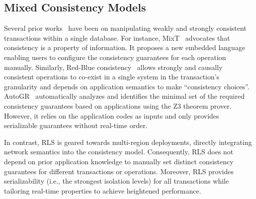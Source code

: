 \subsection{Mixed Consistency Models}\label{sec:related:mixed}
Several prior works~\cite{milano2018mixt, li2012making, wang2021autogr, yang2017hierarchical, li2018fine, gao2003application, kraska2009consistency, mdcc:eurosys13} have been on manipulating weakly and strongly consistent transactions within a single database. For instance, MixT~\cite{milano2018mixt} advocates that consistency is a property of information. It proposes a new embedded language enabling users to configure the consistency guarantees for each operation manually. Similarly, Red-Blue consistency~\cite{li2012making} allows strongly and causally consistent operations to co-exist in a single system in the transaction's granularity and depends on application semantics to make ``consistency choices''. AutoGR~\cite{wang2021autogr} automatically analyzes and identifies the minimal set of the required consistency guarantees based on applications using the Z3 theorem prover. However, it relies on the application codes as inputs and only provides serializable guarantees without real-time order.

In contrast, RLS is geared towards multi-region deployments, directly integrating network semantics into the consistency model. Consequently, RLS does not depend on prior application knowledge to manually set distinct consistency guarantees for different transactions or operations. Moreover, RLS provides serializability (i.e., the strongest isolation levels) for all transactions while tailoring real-time properties to achieve heightened performance.